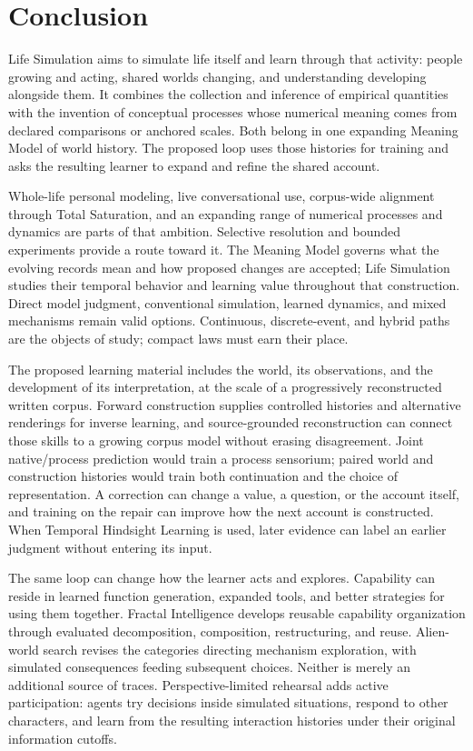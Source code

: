 \documentclass[10pt]{article}
\begin{document}
\section{Conclusion}
\label{sec:conclusion}

Life Simulation aims to simulate life itself and learn through that activity:
people growing and acting, shared worlds changing, and understanding developing
alongside them. It combines the collection and inference of empirical
quantities with the invention of conceptual processes whose numerical meaning
comes from declared comparisons or anchored scales. Both belong in one expanding Meaning Model
of world history. The proposed loop uses those histories for training and
asks the resulting learner to expand and refine the shared account.

Whole-life personal modeling, live conversational use,
corpus-wide alignment through Total Saturation, and an expanding range of
numerical processes and dynamics are parts of that ambition. Selective
resolution and bounded experiments provide a route toward it.
The Meaning Model governs what
the evolving records mean and how proposed changes are accepted; Life
Simulation studies their temporal behavior and learning value throughout that
construction. Direct model judgment, conventional simulation, learned dynamics,
and mixed mechanisms remain valid options. Continuous, discrete-event, and
hybrid paths are the objects of study; compact laws must earn their place.

The proposed learning material includes the world, its observations, and the
development of its interpretation, at the scale of a progressively reconstructed
written corpus. Forward construction supplies controlled histories and alternative
renderings for inverse learning, and source-grounded reconstruction can connect those
skills to a growing corpus model without erasing disagreement. Joint native/process
prediction would train a process sensorium; paired world and construction histories
would train both continuation and the choice of representation. A correction can
change a value, a question, or the account itself, and training on the repair can
improve how the next account is constructed. When Temporal Hindsight Learning is
used, later evidence can label an earlier judgment without entering its input.

The same loop can change how the learner acts and explores. Capability can
reside in learned function generation, expanded tools, and better strategies
for using them together. Fractal
Intelligence develops reusable capability organization through evaluated
decomposition, composition, restructuring, and reuse. Alien-world search
revises the categories directing mechanism exploration, with simulated
consequences feeding subsequent choices. Neither is merely an additional
source of traces. Perspective-limited rehearsal adds active participation:
agents try decisions inside simulated situations, respond to other characters,
and learn from the resulting interaction histories under their original
information cutoffs.
\end{document}
